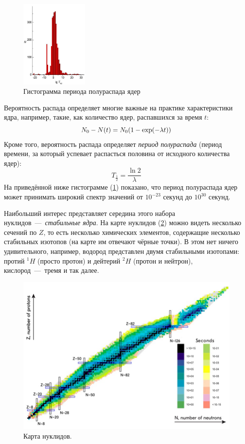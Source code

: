 \documentclass[12pt]{article}
\begin{document}
\begin{figure}
\centering
\includegraphics[width=0.3\textwidth]{2.jpg}
\caption{\label{2}Гистограмма периода полураспада ядер}
\end{figure}

\par
Вероятность распада определяет многие важные на практике характеристики ядра, например, такие, как количество ядер, распавшихся за время $t$:
\begin{equation}
 N_0 - N\qty(t) = N_0\qty(1-\exp(-\lambda t))
\end{equation}
Кроме того, вероятность распада определяет \emph{период полураспада} (период времени, за который успевает распасться половина от исходного количества ядер):
\begin{equation}
 T_{\tfrac{1}{2}} =  \dfrac{\ln{2}}{\lambda}
\end{equation}
На приведённой ниже гистограмме (\ref{2}) показано, что период полураспада ядер может принимать широкий спектр значений от $10^{-23}$ секунд до $10^{30}$ секунд.

\par
Наибольший интерес представляет середина этого набора нуклидов~\----~\emph{стабильные ядра}. На карте нуклидов (\ref{3}) можно видеть несколько сечений по $Z$, то есть несколько химических элементов, содержащие несколько стабильных изотопов (на карте им отвечают чёрные точки). В этом нет ничего удивительного, например, водород представлен двумя стабильными изотопами: протий ${}^1 H$ (просто протон) и дейтерий ${}^2 H$ (протон и нейтрон), кислород~\----~тремя и так далее.

\begin{figure}[ht]
 \centering
 \includegraphics[width = 1\textwidth]{3.jpg}
 \caption{Карта нуклидов.}
 \label{3}
\end{figure}
\end{document}
